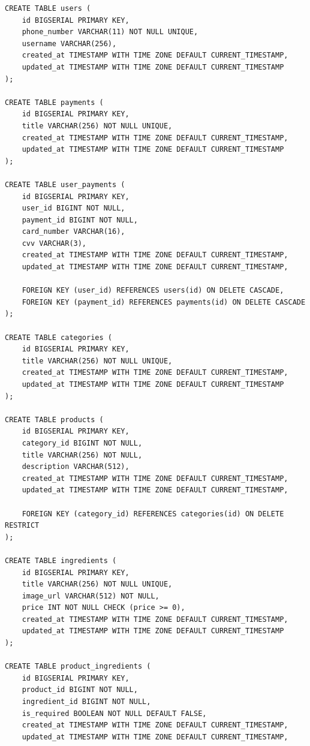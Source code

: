 \documentclass[a4paper,14pt]{extarticle}
\begin{document}
  \noindent
  \begin{Verbatim}[tabsize=4,fontsize=\small]
CREATE TABLE users (
    id BIGSERIAL PRIMARY KEY,
    phone_number VARCHAR(11) NOT NULL UNIQUE,
    username VARCHAR(256),
    created_at TIMESTAMP WITH TIME ZONE DEFAULT CURRENT_TIMESTAMP,
    updated_at TIMESTAMP WITH TIME ZONE DEFAULT CURRENT_TIMESTAMP
);

CREATE TABLE payments (
    id BIGSERIAL PRIMARY KEY,
    title VARCHAR(256) NOT NULL UNIQUE,
    created_at TIMESTAMP WITH TIME ZONE DEFAULT CURRENT_TIMESTAMP,
    updated_at TIMESTAMP WITH TIME ZONE DEFAULT CURRENT_TIMESTAMP
);

CREATE TABLE user_payments (
    id BIGSERIAL PRIMARY KEY,
    user_id BIGINT NOT NULL,
    payment_id BIGINT NOT NULL,
    card_number VARCHAR(16),
    cvv VARCHAR(3),
    created_at TIMESTAMP WITH TIME ZONE DEFAULT CURRENT_TIMESTAMP,
    updated_at TIMESTAMP WITH TIME ZONE DEFAULT CURRENT_TIMESTAMP,

    FOREIGN KEY (user_id) REFERENCES users(id) ON DELETE CASCADE,
    FOREIGN KEY (payment_id) REFERENCES payments(id) ON DELETE CASCADE
);

CREATE TABLE categories (
    id BIGSERIAL PRIMARY KEY,
    title VARCHAR(256) NOT NULL UNIQUE,
    created_at TIMESTAMP WITH TIME ZONE DEFAULT CURRENT_TIMESTAMP,
    updated_at TIMESTAMP WITH TIME ZONE DEFAULT CURRENT_TIMESTAMP
);

CREATE TABLE products (
    id BIGSERIAL PRIMARY KEY,
    category_id BIGINT NOT NULL,
    title VARCHAR(256) NOT NULL,
    description VARCHAR(512),
    created_at TIMESTAMP WITH TIME ZONE DEFAULT CURRENT_TIMESTAMP,
    updated_at TIMESTAMP WITH TIME ZONE DEFAULT CURRENT_TIMESTAMP,

    FOREIGN KEY (category_id) REFERENCES categories(id) ON DELETE RESTRICT
);

CREATE TABLE ingredients (
    id BIGSERIAL PRIMARY KEY,
    title VARCHAR(256) NOT NULL UNIQUE,
    image_url VARCHAR(512) NOT NULL,
    price INT NOT NULL CHECK (price >= 0),
    created_at TIMESTAMP WITH TIME ZONE DEFAULT CURRENT_TIMESTAMP,
    updated_at TIMESTAMP WITH TIME ZONE DEFAULT CURRENT_TIMESTAMP
);

CREATE TABLE product_ingredients (
    id BIGSERIAL PRIMARY KEY,
    product_id BIGINT NOT NULL,
    ingredient_id BIGINT NOT NULL,
    is_required BOOLEAN NOT NULL DEFAULT FALSE,
    created_at TIMESTAMP WITH TIME ZONE DEFAULT CURRENT_TIMESTAMP,
    updated_at TIMESTAMP WITH TIME ZONE DEFAULT CURRENT_TIMESTAMP,


\end{Verbatim}
\end{document}
